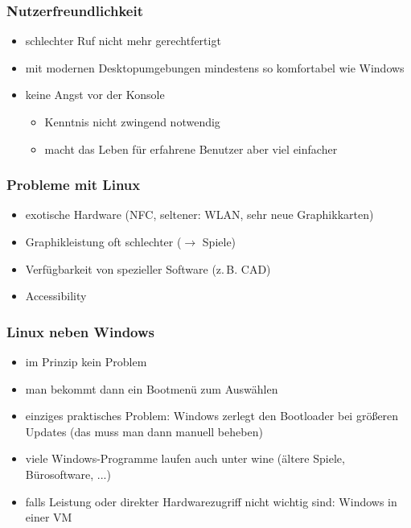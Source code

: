 \documentclass[t]{beamer}
\begin{document}
\begin{frame}
  \frametitle{Nutzerfreundlichkeit}
  \begin{itemize}
  \item schlechter Ruf nicht mehr gerechtfertigt
  \item mit modernen Desktopumgebungen mindestens so komfortabel wie
    Windows
  \item keine Angst vor der Konsole
    \begin{itemize}
    \item Kenntnis nicht zwingend notwendig
    \item macht das Leben für erfahrene Benutzer aber viel einfacher
    \end{itemize}
  \end{itemize}
\end{frame}

\begin{frame}
  \frametitle{Probleme mit Linux}
  \begin{itemize}
  \item exotische Hardware (NFC, seltener: WLAN, sehr neue Graphikkarten)
  \item Graphikleistung oft schlechter ($\rightarrow$ Spiele)
  \item Verfügbarkeit von spezieller Software (z.\,B. CAD)
  \item Accessibility
  \end{itemize}
\end{frame}

\begin{frame}
  \frametitle{Linux neben Windows}
  \begin{itemize}
  \item im Prinzip kein Problem
  \item man bekommt dann ein Bootmenü zum Auswählen
  \item einziges praktisches Problem: Windows zerlegt den Bootloader
    bei größeren Updates (das muss man dann manuell beheben)
  \item viele Windows-Programme laufen auch unter wine (ältere Spiele,
    Bürosoftware, ...)
  \item falls Leistung oder direkter Hardwarezugriff nicht wichtig
    sind: Windows in einer VM
  \end{itemize}
\end{frame}
\end{document}
